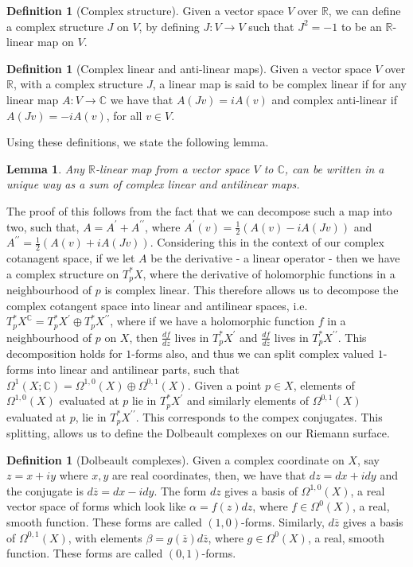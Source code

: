 \documentclass[11pt]{report}
\newtheorem{lemma}[thm]{Lemma}
\theoremstyle{definition}
\newtheorem{defn}[thm]{Definition}
\begin{document}
\begin{defn}[Complex structure]\label{Cstructure}
  Given a vector space $V$ over $\mathbb{R}$, we can define a complex structure $J$ on $V$, by defining $J : V \rightarrow V$ such that $J^2 = -1$ to be an $\mathbb{R}$-linear map on $V$.
\end{defn}
\begin{defn}[Complex linear and anti-linear maps]
  Given a vector space $V$ over $\mathbb{R}$, with a complex structure $J$, a linear map is said to be complex linear if for any linear map $A: V \rightarrow \mathbb{C}$ we have that $A(Jv)=iA(v)$ and complex anti-linear if $A(Jv) = -iA(v)$, for all $v \in V$.
\end{defn}
Using these definitions, we state the following lemma.
\begin{lemma}
  Any $\mathbb{R}$-linear map from a vector space $V$ to $\mathbb{C}$, can be written in a unique way as a sum of complex linear and antilinear maps.
\end{lemma}
The proof of this follows from the fact that we can decompose such a map into two, such that, $A = A^{\prime} + A^{\prime\prime}$, where $A^{\prime}(v) = \frac{1}{2}(A(v)-iA(Jv))$ and $A^{\prime\prime} = \frac{1}{2}(A(v)+iA(Jv))$. Considering this in the context of our complex cotanagent space, if we let $A$ be the derivative - a linear operator - then we have a complex structure on $T_p^*X$, where the derivative of holomorphic functions in a neighbourhood of $p$ is complex linear. This therefore allows us to decompose the complex cotangent space into linear and antilinear spaces, i.e.\ $T_p^*X^{\mathbb{C}} = T_p^*X^{\prime} \oplus T_p^*X^{\prime\prime}$, where if we have a holomorphic function $f$ in a neighbourhood of $p$ on $X$, then $\frac{df}{dz}$ lives in $T_p^*X^{\prime}$ and $\frac{df}{d\overline{z}}$ lives in $T_p^*X^{\prime\prime}$. This decomposition holds for $1$-forms also, and thus we can split complex valued $1$-forms into linear and antilinear parts, such that $\Omega^1(X;\mathbb{C}) = \Omega^{1,0}(X) \oplus \Omega^{0,1}(X)$. Given a point $p \in X$, elements of $\Omega^{1,0}(X)$ evaluated at $p$ lie in $T_p^*X^{\prime}$ and similarly elements of $\Omega^{0,1}(X)$ evaluated at $p$, lie in $T_p^*X^{\prime\prime}$. This corresponds to the compex conjugates. This splitting, allows us to define the Dolbeault complexes on our Riemann surface.
\begin{defn}[Dolbeault complexes]
  Given a complex coordinate on $X$, say $z=x+iy$ where $x,y$ are real coordinates, then, we have that $dz = dx+idy$ and the conjugate is  $d\overline{z} = dx - idy$. The form $dz$ gives a basis of $\Omega^{1,0}(X)$, a real vector space of forms which look like $\alpha = f(z)dz$, where $f \in \Omega^0(X)$, a real, smooth function. These forms are called $(1,0)$-forms. Similarly, $d\overline{z}$ gives a basis of $\Omega^{0,1}(X)$, with elements $\beta = g(\overline{z})d\overline{z}$, where $g \in \Omega^0(X)$, a real, smooth function. These forms are called $(0,1)$-forms.
\end{defn}
\end{document}
